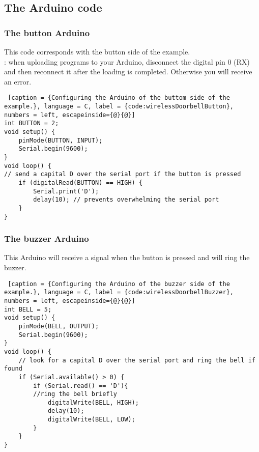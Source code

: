 \subsection{The Arduino code}
\subsubsection{The button Arduino}
This code corresponds with the button side of the example.
\\
{\color{red}{There's a trap!}}: when uploading programs to your Arduino, disconnect the digital pin 0 (RX) and then reconnect it after the loading is completed. Otherwise you will receive an error.

\begin{lstlisting} [caption = {Configuring the Arduino of the buttom side of the example.}, language = C, label = {code:wirelessDoorbellButton}, numbers = left, escapeinside={@}{@}] 
int BUTTON = 2;
void setup() { 
	pinMode(BUTTON, INPUT); 
	Serial.begin(9600);
}
void loop() {
// send a capital D over the serial port if the button is pressed
	if (digitalRead(BUTTON) == HIGH) { 
		Serial.print('D');
		delay(10); // prevents overwhelming the serial port 
	}
}
\end{lstlisting}

\subsubsection{The buzzer Arduino}
This Arduino will receive a signal when the button is pressed and will ring the buzzer.

\begin{lstlisting} [caption = {Configuring the Arduino of the buzzer side of the example.}, language = C, label = {code:wirelessDoorbellBuzzer}, numbers = left, escapeinside={@}{@}]
int BELL = 5;
void setup() { 
	pinMode(BELL, OUTPUT); 
	Serial.begin(9600);
}
void loop() {
	// look for a capital D over the serial port and ring the bell if found 
	if (Serial.available() > 0) {
		if (Serial.read() == 'D'){ 
		//ring the bell briefly 
			digitalWrite(BELL, HIGH); 
			delay(10); 
			digitalWrite(BELL, LOW);
		}		 
	}
}
\end{lstlisting}







